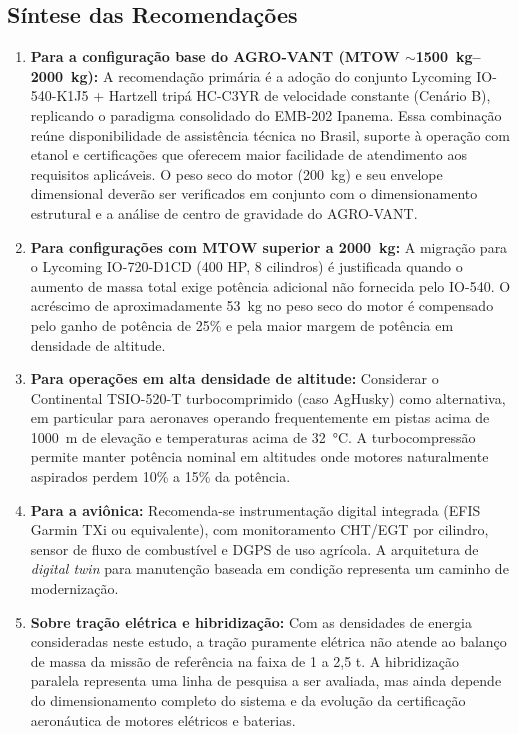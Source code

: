 \documentclass[a4paper,12pt]{article}
\begin{document}
\subsection{Síntese das Recomendações}

\begin{enumerate}
    \item \textbf{Para a configuração base do AGRO-VANT (MTOW $\sim$\SI{1500}{kg}--\SI{2000}{kg}):} A recomendação primária é a adoção do conjunto Lycoming IO-540-K1J5 + Hartzell tripá HC-C3YR de velocidade constante (Cenário B), replicando o paradigma consolidado do EMB-202 Ipanema. Essa combinação reúne disponibilidade de assistência técnica no Brasil, suporte à operação com etanol e certificações que oferecem maior facilidade de atendimento aos requisitos aplicáveis. O peso seco do motor (\SI{200}{kg}) e seu envelope dimensional deverão ser verificados em conjunto com o dimensionamento estrutural e a análise de centro de gravidade do AGRO-VANT.
    
    \item \textbf{Para configurações com MTOW superior a \SI{2000}{kg}:} A migração para o Lycoming IO-720-D1CD (400 HP, 8 cilindros) é justificada quando o aumento de massa total exige potência adicional não fornecida pelo IO-540. O acréscimo de aproximadamente \SI{53}{kg} no peso seco do motor é compensado pelo ganho de potência de 25\% e pela maior margem de potência em densidade de altitude.
    
    \item \textbf{Para operações em alta densidade de altitude:} Considerar o Continental TSIO-520-T turbocomprimido (caso AgHusky) como alternativa, em particular para aeronaves operando frequentemente em pistas acima de \SI{1000}{m} de elevação e temperaturas acima de \SI{32}{\degreeCelsius}. A turbocompressão permite manter potência nominal em altitudes onde motores naturalmente aspirados perdem 10\% a 15\% da potência.
    
    \item \textbf{Para a aviônica:} Recomenda-se instrumentação digital integrada (EFIS Garmin TXi ou equivalente), com monitoramento CHT/EGT por cilindro, sensor de fluxo de combustível e DGPS de uso agrícola. A arquitetura de \textit{digital twin} para manutenção baseada em condição representa um caminho de modernização.
    
    \item \textbf{Sobre tração elétrica e hibridização:} Com as densidades de energia consideradas neste estudo, a tração puramente elétrica não atende ao balanço de massa da missão de referência na faixa de 1 a 2{,}5 t. A hibridização paralela representa uma linha de pesquisa a ser avaliada, mas ainda depende do dimensionamento completo do sistema e da evolução da certificação aeronáutica de motores elétricos e baterias.
\end{enumerate}
\end{document}

